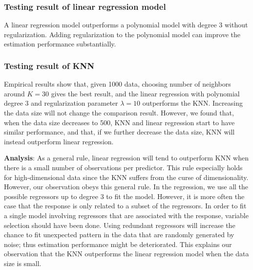 \documentclass[]{article}
\begin{document}
\subsubsection{Testing result of linear regression model}
A linear regression model outperforms a polynomial model with degree 3 without regularization. Adding regularization to the polynomial model can improve the estimation performance substantially. 

\subsubsection{Testing result of KNN}

Empirical results show that, given 1000 data, choosing number of neighbors around $K=30$ gives the best result, and the linear regression with polynomial degree 3 and regularization parameter $\lambda=10$ outperforms the KNN. Increasing the data size will not change the comparison result. However, we found that, when the data size decreases to 500, KNN and linear regression start to have similar performance, and that, if we further decrease the data size, KNN will instead outperform linear regression.

\textbf{Analysis}:  As a general rule, linear regression will tend to outperform KNN when there is a small number of observations per predictor. This rule especially holds for high-dimensional data since the KNN suffers from the curse of dimensionality. However, our observation obeys this general rule. In the regression, we use all the possible regressors up to degree 3 to fit the model. However, it is more often the case that the response is only related to a subset of the regressors. In order to fit a single model involving regressors that are associated with the response, variable selection should have been done. Using redundant regressors will increase the chance to fit unexpected pattern in the data that are randomly generated by noise; thus estimation performance might be deteriorated. This explains our observation that the KNN outperforms the linear regression model when the data size is small. 
\end{document}
